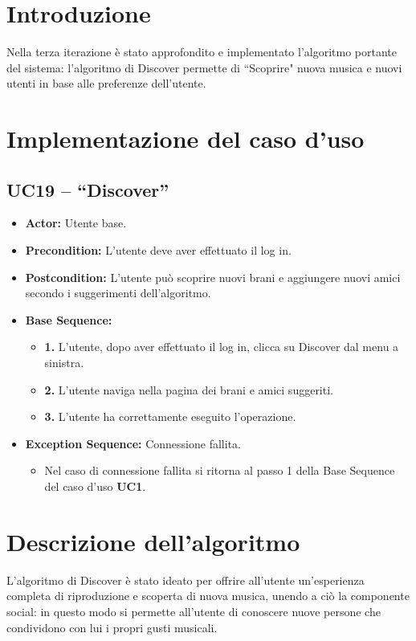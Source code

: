 \section{Introduzione}
Nella terza iterazione è stato approfondito e implementato l'algoritmo portante del sistema: l'algoritmo di Discover permette di ``Scoprire" nuova 
musica e nuovi utenti in base alle preferenze dell'utente.

\section{Implementazione del caso d'uso}
\subsection{UC19 -- ``Discover''}
\begin{itemize}
    \item \textbf{Actor:} Utente base.
    \item \textbf{Precondition:} L'utente deve aver effettuato il log in.
    \item \textbf{Postcondition:} L'utente può scoprire nuovi brani e aggiungere nuovi amici secondo i suggerimenti dell'algoritmo. 
    \item \textbf{Base Sequence:}
    \begin{itemize}
        \item \textbf{1.} L'utente, dopo aver effettuato il log in, clicca su Discover dal menu a sinistra.
        \item \textbf{2.} L'utente naviga nella pagina dei brani e amici suggeriti.
        \item \textbf{3.} L'utente ha correttamente eseguito l'operazione.
    \end{itemize}
    \item \textbf{Exception Sequence:} Connessione fallita.
    \begin{itemize}
        \item Nel caso di connessione fallita si ritorna al passo 1 della Base Sequence del caso d'uso \textbf{UC1}.
    \end{itemize}
\end{itemize}
\vspace{1cm}

\section{Descrizione dell'algoritmo}
L'algoritmo di Discover è stato ideato per offrire all'utente un'esperienza completa di riproduzione e scoperta di nuova musica, unendo a ciò la 
componente social: in questo modo si permette all'utente di conoscere nuove persone che condividono con lui i propri gusti musicali. 

